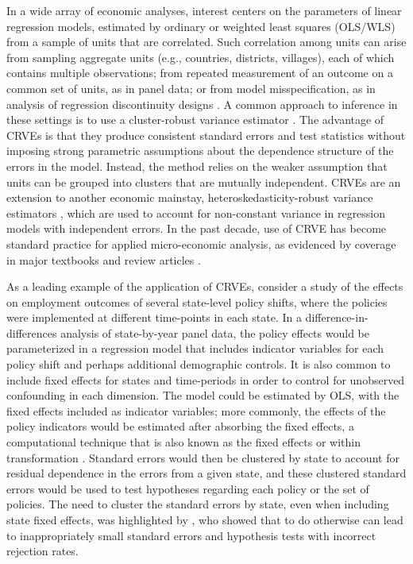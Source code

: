 \documentclass[draft]{ectaart}\usepackage[]{graphicx}\usepackage[]{color}
\begin{document}
In a wide array of economic analyses, interest centers on the parameters of linear regression models, estimated by ordinary or weighted least squares (OLS/WLS) from a sample of units that are correlated. 
Such correlation among units can arise from sampling aggregate units (e.g., countries, districts, villages), each of which contains multiple observations; from repeated measurement of an outcome on a common set of units, as in panel data; or from model misspecification, as in analysis of regression discontinuity designs \citep[e.g.,][]{Lee2008regression}. 
A common approach to inference in these settings is to use a cluster-robust variance estimator \citep[CRVE;][]{Arellano1987computing, Liang1986longitudinal, white1984asymptotic}.
The advantage of CRVEs is that they produce consistent standard errors and test statistics without imposing strong parametric assumptions about the dependence structure of the errors in the model.
Instead, the method relies on the weaker assumption that units can be grouped into clusters that are mutually independent. 
CRVEs are an extension to another economic mainstay, heteroskedasticity-robust variance estimators \citep{Huber1967behavior, White1980heteroskedasticity}, which are used to account for non-constant variance in regression models with independent errors.
In the past decade, use of CRVE has become standard practice for applied micro-economic analysis, as evidenced by coverage in major textbooks and review articles \citep[e.g.,][]{Wooldridge2010econometric, Angrist2009mostly, Cameron2015practitioners}.

As a leading example of the application of CRVEs, consider a study of the effects on employment outcomes of several state-level policy shifts, where the policies were implemented at different time-points in each state. 
In a difference-in-differences analysis of state-by-year panel data, the policy effects would be parameterized in a regression model that includes indicator variables for each policy shift and perhaps additional demographic controls. It is also common to include fixed effects for states and time-periods in order to control for unobserved confounding in each dimension. 
The model could be estimated by OLS, with the fixed effects included as indicator variables; more commonly, the effects of the policy indicators would be estimated after absorbing the fixed effects, a computational technique that is also known as the fixed effects or within transformation \citep{Wooldridge2010econometric}. 
Standard errors would then be clustered by state to account for residual dependence in the errors from a given state, and these clustered standard errors would be used to test hypotheses regarding each policy or the set of policies.
The need to cluster the standard errors by state, even when including state fixed effects, was highlighted by \citet{Bertrand2004how}, who showed that to do otherwise can lead to inappropriately small standard errors and hypothesis tests with incorrect rejection rates. 
\end{document}
